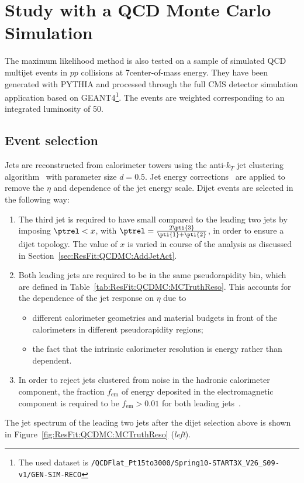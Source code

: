 

\section{Study with a QCD Monte Carlo Simulation}\label{sec:ResFit:QCDMC}

The maximum likelihood method is also tested on a sample of simulated QCD multijet events in $pp$ collisions at 7\tev center-of-mass energy.
They have been generated with PYTHIA and processed through the full CMS detector simulation application based on GEANT4\footnote{The used dataset is \texttt{/QCDFlat\_Pt15to3000/Spring10-START3X\_V26\_S09-v1/GEN-SIM-RECO}}.
The events are weighted corresponding to an integrated luminosity of 50\pbinv.


\subsection{Event selection}\label{sec:ResFit:QCDMC:EvtSel}

Jets are reconstructed from calorimeter towers using the anti-$k_{T}$ jet clustering algorithm~\cite{bib:akj} with parameter size $d=0.5$.
Jet energy corrections~\cite{bib:cmspas:jec} are applied to remove the $\eta$ and \pt dependence of the jet energy scale.
Dijet events are selected in the following way:
\begin{enumerate}
\item The third jet is required to have small \pt compared to the leading two jets by imposing \mbox{$\ptrel < x$}, with \mbox{$\ptrel = \frac{2\pti{3}}{\pti{1} + \pti{2}}$}, in order to ensure a dijet topology.
  The value of $x$ is varied in course of the analysis as discussed in Section~\ref{sec:ResFit:QCDMC:AddJetAct}.
\item Both leading jets are required to be in the same pseudorapidity bin, which are defined in Table~\ref{tab:ResFit:QCDMC:MCTruthReso}.
  This accounts for the dependence of the jet \pt response on $\eta$ due to
  \begin{itemize}
  \item different calorimeter geometries and material budgets in front of the calorimeters in different pseudorapidity regions;
  \item the fact that the intrinsic calorimeter resolution is energy rather than \pt dependent.
  \end{itemize}
\item In order to reject jets clustered from noise in the hadronic calorimeter component, the fraction $f_{\text{em}}$ of energy deposited in the electromagnetic component is required to be \mbox{$f_{\text{em}} > 0.01$} for both leading jets~\cite{bib:cmspas:jetid}.
\end{enumerate}
The jet \ptparticle spectrum of the leading two jets after the dijet selection above is shown in Figure~\ref{fig:ResFit:QCDMC:MCTruthReso} (\textit{left}).


